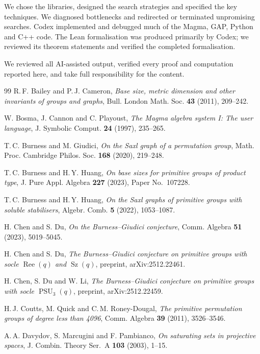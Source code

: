 \documentclass[a4paper,reqno,11pt]{amsart}
\numberwithin{equation}{section}
\begin{document}
We chose the libraries, designed the search strategies and specified the key techniques. We diagnosed bottlenecks and redirected or terminated unpromising searches. Codex implemented and debugged much of the Magma, GAP, Python and C++ code. The Lean formalisation was produced primarily by Codex; we reviewed its theorem statements and verified the completed formalisation. 

We reviewed all AI-assisted output, verified every proof and computation reported here, and take full responsibility for the content.


\begin{thebibliography}{99}
 R.\,F. Bailey and P.\,J. Cameron, {\it Base size, metric dimension and other invariants of groups and graphs}, Bull. London Math. Soc. {\bf 43} (2011), 209--242.

 W. Bosma, J. Cannon and C. Playoust, {\it The Magma algebra system I: The user language}, J. Symbolic Comput. {\bf 24} (1997), 235--265.

 T.\,C. Burness and M. Giudici, {\it On the Saxl graph of a permutation group}, Math. Proc. Cambridge Philos. Soc. {\bf 168} (2020), 219--248.

 T.\,C. Burness and H.\,Y. Huang, {\it On base sizes for primitive groups of product type}, J. Pure Appl. Algebra {\bf 227} (2023), Paper No.~107228.

 T.\,C. Burness and H.\,Y. Huang, {\it On the Saxl graphs of primitive groups with soluble stabilisers}, Algebr. Comb. {\bf 5} (2022), 1053--1087.

 H. Chen and S. Du, {\it On the Burness--Giudici conjecture}, Comm. Algebra {\bf 51} (2023), 5019--5045.

 H. Chen and S. Du, {\it The Burness--Giudici conjecture on primitive groups with socle $\operatorname{Ree}(q)$ and $\operatorname{Sz}(q)$}, preprint, arXiv:2512.22461.

 H. Chen, S. Du and W. Li, {\it The Burness--Giudici conjecture on primitive groups with socle $\operatorname{PSU}_3(q)$}, preprint, arXiv:2512.22459.

 H.\,J. Coutts, M. Quick and C.\,M. Roney-Dougal, {\it The primitive permutation groups of degree less than 4096}, Comm. Algebra {\bf 39} (2011), 3526--3546.

 A.\,A. Davydov, S. Marcugini and F. Pambianco, {\it On saturating sets in projective spaces}, J. Combin. Theory Ser.~A {\bf 103} (2003), 1--15.


\end{thebibliography}
\end{document}
